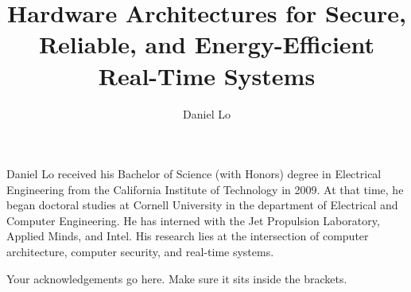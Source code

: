 \documentclass[phd,tocprelim]{cornell}
\title {Hardware Architectures for Secure, Reliable, and Energy-Efficient Real-Time Systems}
\author {Daniel Lo}
\begin{document}
\maketitle
\makecopyright

\begin{abstract}

\end{abstract}

\begin{biosketch}
Daniel Lo received his Bachelor of Science (with Honors) degree in Electrical
Engineering from the California Institute of Technology in 2009. At that time,
he began doctoral studies at Cornell University in the department of Electrical
and Computer Engineering. He has interned with the Jet Propulsion Laboratory,
Applied Minds, and Intel. His research lies at the intersection of computer
architecture, computer security, and real-time systems.
\end{biosketch}


\begin{acknowledgements}
Your acknowledgements go here. Make sure it sits inside the brackets.




\end{acknowledgements}

\contentspage
\tablelistpage
\figurelistpage

\normalspacing \setcounter{page}{1} 
\pagestyle{cornell} \addtolength{\parskip}{0.5\baselineskip}












\end{document}
